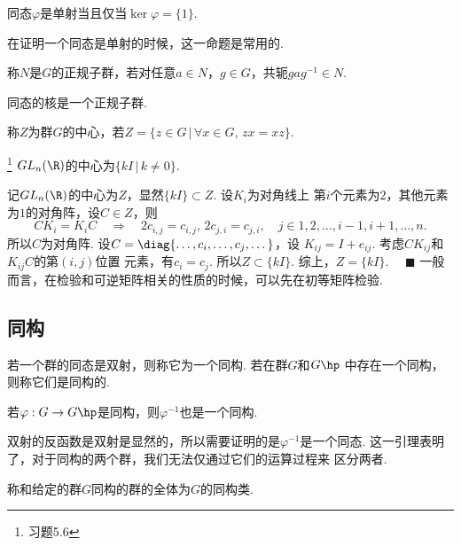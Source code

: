   \begin{cor}[单射]
    同态$\varphi$是单射当且仅当$\ker\varphi = \{1\}$.
  \end{cor}
  \remark
    在证明一个同态是单射的时候，这一命题是常用的.

  \begin{defi}[正规子群]
    称$N$是$G$的正规子群，若对任意$a\in N$，$g\in G$，共轭$gag^{-1}\in N$.
  \end{defi}

  \begin{thm}
    同态的核是一个正规子群.
  \end{thm}

  \begin{defi}[中心]
    称$Z$为群$G$的中心，若$Z=\{z\in G\,|\, \forall x\in G,\,zx=xz\}$.
  \end{defi}

  \begin{pos}
    \footnote{习题5.6}
    $GL_n(\R)$的中心为$\{kI\,|\,k\ne 0\}$.
  \end{pos}
  \proof
    记$GL_n(\R)$的中心为$Z$，显然$\{kI\}\subset Z$. 设$K_i$为对角线上
    第$i$个元素为$2$，其他元素为$1$的对角阵，设$C\in Z$，则
    \[
      CK_i = K_iC \quad\Rightarrow\quad
      2c_{i, j} = c_{i, j},\,2c_{j, i} = c_{j, i},
      \quad j\in{1,2,\dots,i-1,i+1,\dots,n}.
    \]
    所以$C$为对角阵. 设$C=\diag{\dots,c_i,\dots,c_j,\dots}$，设
    $K_{ij} = I+e_{ij}$. 考虑$CK_{ij}$和$K_{ij}C$的第$(i,j)$位置
    元素，有$c_i=c_j$. 所以$Z\subset\{kI\}$. 综上，$Z=\{kI\}$.
    $\quad\blacksquare$
  \remark
    一般而言，在检验和可逆矩阵相关的性质的时候，可以先在初等矩阵检验.

\subsection{同构}

  \begin{defi}
    若一个群的同态是双射，则称它为一个同构. 若在群$G$和$G\hp$
    中存在一个同构，则称它们是同构的.
  \end{defi}

  \begin{lemma}
    若$\varphi:G\to G\hp$是同构，则$\varphi^{-1}$也是一个同构.
  \end{lemma}
  \proof
    双射的反函数是双射是显然的，所以需要证明的是$\varphi^{-1}$是一个同态.
  \remark
    这一引理表明了，对于同构的两个群，我们无法仅通过它们的运算过程来
    区分两者.

  \begin{defi}[同构类]
    称和给定的群$G$同构的群的全体为$G$的同构类.
  \end{defi}

